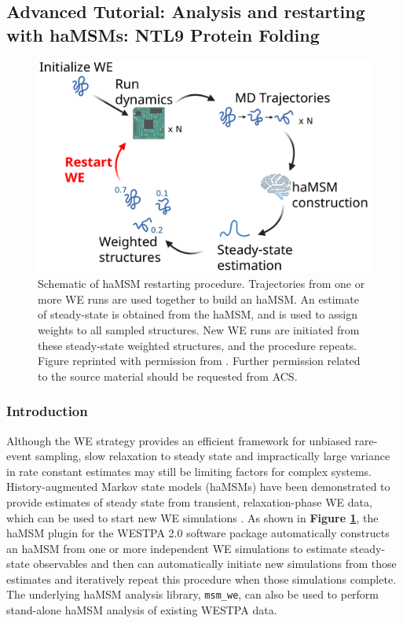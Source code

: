 \subsection{Advanced Tutorial: Analysis and restarting with haMSMs: NTL9 Protein Folding}
\label{tut:hamsm-adv}

\begin{figure}[t]
\centering
\includegraphics[width=\columnwidth]{figures/Figure6_haMSM.pdf}
\caption{Schematic of haMSM restarting procedure. 
Trajectories from one or more WE runs are used together to build an haMSM. 
An estimate of steady-state is obtained from the haMSM, and is used to assign weights to all sampled structures. 
New WE runs are initiated from these steady-state weighted structures, and the procedure repeats. 
Figure reprinted with permission from \citep{russo_westpa_2022}. 
Further permission related to the source material should be requested from ACS.}
\label{fig:hamsm}
\vspace{-0.25cm}
\end{figure}

\subsubsection{Introduction}
Although the WE strategy provides an efficient framework for unbiased rare-event sampling, slow relaxation to steady state and impractically large variance in rate constant estimates may still be limiting factors for complex systems.
History-augmented Markov state models (haMSMs) have been demonstrated to provide estimates of steady state from transient, relaxation-phase WE data, which can be used to start new WE simulations \citep{copperman_accelerated_2020}. 
As shown in \textbf{Figure \ref{fig:hamsm}}, the haMSM plugin for the WESTPA 2.0 software package automatically constructs an haMSM from one or more independent WE simulations to estimate steady-state observables and then can automatically initiate new simulations from those estimates and iteratively repeat this procedure when those simulations complete. 
The underlying haMSM analysis library, \verb|msm_we|, can also be used to perform stand-alone haMSM analysis of existing WESTPA data.




